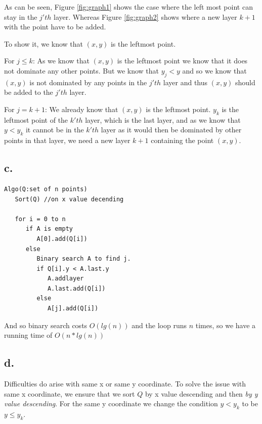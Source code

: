 \documentclass[12pt,a4paper]{report}
\begin{document}
As can be seen, Figure \ref{fig:graph1} shows the case where the left most point can stay in the $j'th$ layer.
Whereas Figure \ref{fig:graph2} shows where a new layer $k+1$ with the point have to be added.

To show it, we know that $(x,y)$ is the leftmost point.

For $j \leq k$:
As we know that $(x,y)$ is the leftmost point we know that it does not dominate any other points. But we know that $y_j < y$ and so we know that $(x,y)$ is not dominated by any points in the $j'th$ layer and thus $(x,y)$ should be added to the $j'th$ layer.

For $j=k+1$:
We already know that $(x,y)$ is the leftmost point. $y_k$ is the leftmost point of the $k'th$ layer, which is the last layer, and as we know that $y<y_k$ it cannot be in the $k'th$ layer as it would then be dominated by other points in that layer, we need a new layer $k+1$ containing the point $(x,y)$.

  
\subsection*{c.}

\begin{lstlisting}
Algo(Q:set of n points)
   Sort(Q) //on x value decending
   
   for i = 0 to n
      if A is empty
         A[0].add(Q[i])
      else
         Binary search A to find j.
         if Q[i].y < A.last.y
            A.addlayer
            A.last.add(Q[i])                  
         else
            A[j].add(Q[i])
\end{lstlisting}
And so binary search costs $O(lg(n))$ and the loop runs $n$ times, so we have a running time of $O(n*lg(n))$

\subsection*{d.}
Difficulties do arise with same x or same y coordinate. To solve the issue with same x coordinate, we ensure that we sort $Q$ by x value descending and then \textit{by y value descending}.
For the same y coordinate we change the condition $y < y_k$ to be $y \leq y_k$.
\end{document}

